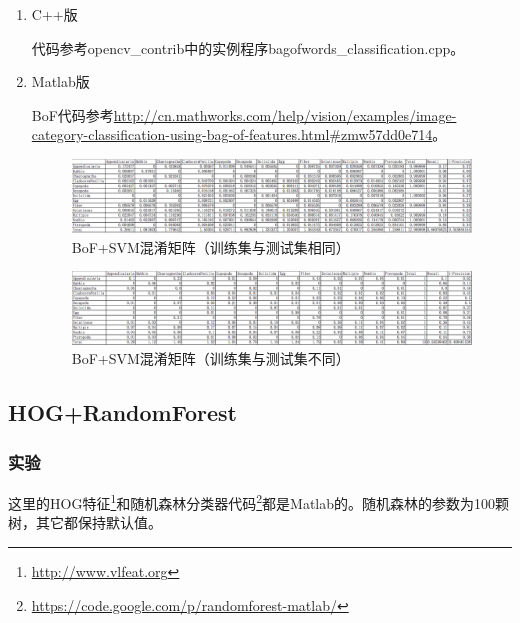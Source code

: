 \documentclass[12pt]{article}
\begin{document}
\begin{enumerate}

\item C++版

代码参考opencv\_contrib中的实例程序bagofwords\_classification.cpp。

\item Matlab版

BoF代码参考\url{http://cn.mathworks.com/help/vision/examples/image-category-classification-using-bag-of-features.html#zmw57dd0e714}。
\begin{figure}[!ht]
\centering
\includegraphics[width=1.0\linewidth]{Train-CM-BoF-SVM-Linear}
\caption{BoF+SVM混淆矩阵（训练集与测试集相同）}
\label{fig:Train-CM-BoF-SVM-Linear}
\end{figure}

\begin{figure}[!ht]
\centering
\includegraphics[width=1.0\linewidth]{Test-CM-BoF-SVM-Linear}
\caption{BoF+SVM混淆矩阵（训练集与测试集不同）}
\label{fig:Test-CM-BoF-SVM-Linear}
\end{figure}

\end{enumerate}

\subsection{HOG+RandomForest}

\subsubsection{实验}

这里的HOG特征\footnote{\url{http://www.vlfeat.org}}和随机森林分类器代码\footnote{\url{https://code.google.com/p/randomforest-matlab/}}都是Matlab的。随机森林的参数为100颗树，其它都保持默认值。
\end{document}
